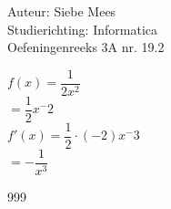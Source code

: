 \documentclass[a4paper]{article}
\begin{document}
  
\noindent \large Auteur: Siebe Mees \\
\noindent \large Studierichting: Informatica\\
\noindent \large Oefeningenreeks 3A nr. 19.2\\

\medskip

\normalsize

$ f(x) = \dfrac{1}{2x^2} $ \\

$ = \dfrac{1}{2}x^-2 $ \\

$ f'(x) = \dfrac{1}{2} \cdot (-2)x^-3 $ \\

$  = -\dfrac{1}{x^3}$ \\

\begin{thebibliography}{999}
\end{thebibliography}
\end{document}
